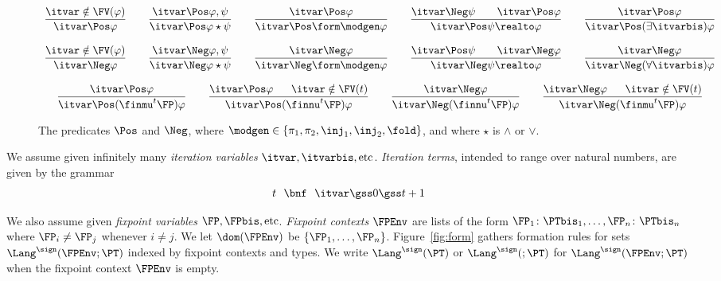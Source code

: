 \begin{figure}[t!]
\centering
\(
\begin{array}{c}
%
\dfrac{\itvar \notin \FV(\varphi)}
  {\itvar \Pos \varphi}
%
\qquad
%
\dfrac{\itvar \Pos \varphi, \psi}
  {\itvar \Pos \varphi \star \psi}
%
\qquad
%
\dfrac{\itvar \Pos \varphi}
  {\itvar \Pos \form\modgen \varphi}
%
\qquad
%
\dfrac{\itvar \Neg \psi
  \qquad
  \itvar \Pos \varphi}
  {\itvar \Pos \psi \realto \varphi}
%
\qquad
%
\dfrac{\itvar \Pos \varphi}
  {\itvar \Pos (\exists \itvarbis)\varphi}
%
\\\\
%
\dfrac{\itvar \notin \FV(\varphi)}
  {\itvar \Neg \varphi}
%
\qquad
%
\dfrac{\itvar \Neg \varphi, \psi}
  {\itvar \Neg \varphi \star \psi}
%
\qquad
%
\dfrac{\itvar \Neg \varphi}
  {\itvar \Neg \form\modgen \varphi}
%
\qquad
%
\dfrac{\itvar \Pos \psi
  \qquad
  \itvar \Neg \varphi}
  {\itvar \Neg \psi \realto \varphi}
%
\qquad
%
\dfrac{\itvar \Neg \varphi}
  {\itvar \Neg (\forall \itvarbis)\varphi}
%
\\\\
%
\dfrac{\itvar \Pos \varphi}
  {\itvar \Pos (\finmu^t \FP)\varphi}
%
\qquad
%
\dfrac{\itvar \Pos \varphi
  \quad~~
  \itvar \notin \FV(t)}
  {\itvar \Pos (\finnu^t \FP)\varphi}
%
\qquad
%
\dfrac{\itvar \Neg \varphi}
  {\itvar \Neg (\finnu^t \FP)\varphi}
%
\qquad
%
\dfrac{\itvar \Neg \varphi
  \quad~~
  \itvar \notin \FV(t)}
  {\itvar \Neg (\finmu^t \FP)\varphi}
%
\end{array}
\)
\caption{The predicates $\Pos$ and $\Neg$,
where $\modgen \in \{\pi_1,\pi_2, \inj_1, \inj_2, \fold\}$,
and where $\star$ is $\land$ or $\lor$.%
\label{fig:posneg}}
\end{figure}




We assume given infinitely many \emph{iteration variables}
$\itvar, \itvarbis, \text{etc}$.
\emph{Iteration terms},
intended to range over natural numbers,
are given by the grammar
\[
\begin{array}{r @{~~} c @{~~} l}
     t
&    \bnf
&    \itvar
\gss 0
\gss t+1
\end{array}
\]

We also assume given \emph{fixpoint variables}
$\FP, \FPbis, \text{etc}$.
\emph{Fixpoint contexts} $\FPEnv$ are
lists of the form
$\FP_1\colon \PTbis_1,\dots,\FP_n \colon \PTbis_n$
where $\FP_i \neq \FP_j$ whenever $i \neq j$.
We let $\dom(\FPEnv)$ be $\{\FP_1,\dots,\FP_n\}$.
%
Figure~\ref{fig:form} gathers formation rules for sets $\Lang^\sign(\FPEnv;\PT)$
indexed by fixpoint contexts and types.
We write $\Lang^\sign(\PT)$ or $\Lang^\sign(;\PT)$ 
for $\Lang^\sign(\FPEnv;\PT)$
when the fixpoint context $\FPEnv$ is empty.

